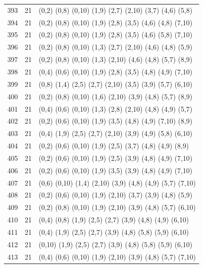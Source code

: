 \begin{appendix}
{\begin{longtable}{lll}
    393& 21 & (0,2)   (0,8)   (0,10)  (1,9)   (2,7)   (2,10)  (3,7)   (4,6)   (5,8)\\
    394& 21 & (0,2)   (0,8)   (0,10)  (1,9)   (2,8)   (3,5)   (4,6)   (4,8)   (7,10)\\
    395& 21 & (0,2)   (0,8)   (0,10)  (1,9)   (2,8)   (3,5)   (4,6)   (5,8)   (7,10)\\
    396& 21 & (0,2)   (0,8)   (0,10)  (1,3)   (2,7)   (2,10)  (4,6)   (4,8)   (5,9)\\
    397& 21 & (0,2)   (0,8)   (0,10)  (1,3)   (2,10)  (4,6)   (4,8)   (5,7)   (8,9)\\
    398& 21 & (0,4)   (0,6)   (0,10)  (1,9)   (2,8)   (3,5)   (4,8)   (4,9)   (7,10)\\
    399& 21 & (0,8)   (1,4)   (2,5)   (2,7)   (2,10)  (3,5)   (3,9)   (5,7)   (6,10)\\
    400& 21 & (0,2)   (0,8)   (0,10)  (1,6)   (2,10)  (3,9)   (4,8)   (5,7)   (8,9)\\
    401& 21 & (0,4)   (0,6)   (0,10)  (1,3)   (2,8)   (2,10)  (4,8)   (4,9)   (5,7)\\
    402& 21 & (0,2)   (0,6)   (0,10)  (1,9)   (3,5)   (4,8)   (4,9)   (7,10)  (8,9)\\
    403& 21 & (0,4)   (1,9)   (2,5)   (2,7)   (2,10)  (3,9)   (4,9)   (5,8)   (6,10)\\
    404& 21 & (0,2)   (0,6)   (0,10)  (1,9)   (2,5)   (3,7)   (4,8)   (4,9)   (8,9)\\
    405& 21 & (0,2)   (0,6)   (0,10)  (1,9)   (2,5)   (3,9)   (4,8)   (4,9)   (7,10)\\
    406& 21 & (0,2)   (0,6)   (0,10)  (1,9)   (3,5)   (3,9)   (4,8)   (4,9)   (7,10)\\
    407& 21 & (0,6)   (0,10)  (1,4)   (2,10)  (3,9)   (4,8)   (4,9)   (5,7)   (7,10)\\
    408& 21 & (0,2)   (0,6)   (0,10)  (1,9)   (2,10)  (3,7)   (3,9)   (4,8)   (5,9)\\
    409& 21 & (0,2)   (0,8)   (0,10)  (1,9)   (2,10)  (3,9)   (4,8)   (5,7)   (6,10)\\
    410& 21 & (0,4)   (0,8)   (1,9)   (2,5)   (2,7)   (3,9)   (4,8)   (4,9)   (6,10)\\
    411& 21 & (0,4)   (1,9)   (2,5)   (2,7)   (3,9)   (4,8)   (5,8)   (5,9)   (6,10)\\
    412& 21 & (0,10)  (1,9)   (2,5)   (2,7)   (3,9)   (4,8)   (5,8)   (5,9)   (6,10)\\
    413& 21 & (0,4)   (0,6)   (0,10)  (1,9)   (2,10)  (3,9)   (4,8)   (5,7)   (7,10)\\

\end{longtable}}
\end{appendix}
